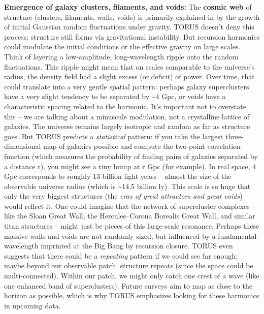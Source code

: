 \documentclass[
]{article}
\begin{document}
{\textbf{Emergence of galaxy clusters, filaments, and voids:} The
\textbf{cosmic web} of structure (clusters, filaments, walls, voids) is
primarily explained in \LambdaCDM by the growth of initial Gaussian random
fluctuations under gravity. TORUS doesn't deny this process; structure
still forms via gravitational instability. But recursion harmonics could
modulate the initial conditions or the effective gravity on large
scales. Think of layering a low-amplitude, long-wavelength ripple onto
the random fluctuations. This ripple might mean that on scales
comparable to the universe's radius, the density field had a slight
excess (or deficit) of power. Over time, that could translate into a
very gentle spatial pattern: perhaps galaxy superclusters have a very
slight tendency to be separated by \textasciitilde4 Gpc, or voids have a
characteristic spacing related to the harmonic. It's important not to
overstate this -- we are talking about a minuscule modulation, not a
crystalline lattice of galaxies. The universe remains largely isotropic
and random as far as structure goes. But TORUS predicts a
\emph{statistical} pattern: if you take the largest three-dimensional
map of galaxies possible and compute the two-point correlation function
(which measures the probability of finding pairs of galaxies separated
by a distance r), you might see a tiny bump at r  Gpc (for
example)\hspace{0pt}. In real space, 4 Gpc corresponds to roughly 13
billion light years -- almost the size of the observable universe radius
(which is \textasciitilde14.5 billion ly). This scale is so huge that
only the very biggest structures (the \emph{eras of great attractors and
great voids}) would reflect it. One could imagine that the network of
supercluster complexes -- like the Sloan Great Wall, the
Hercules--Corona Borealis Great Wall, and similar titan structures --
might just be pieces of this large-scale resonance. Perhaps these
massive walls and voids are not randomly sized, but influenced by a
fundamental wavelength imprinted at the Big Bang by recursion closure.
TORUS even suggests that there could be a \emph{repeating} pattern if we
could see far enough: maybe beyond our observable patch, structure
repeats (since the space could be multi-connected). Within our patch, we
might only catch one crest of a wave (like one enhanced band of
superclusters). Future surveys aim to map as close to the horizon as
possible, which is why TORUS emphasizes looking for these harmonics in
upcoming data\hspace{0pt}.

}
\end{document}
